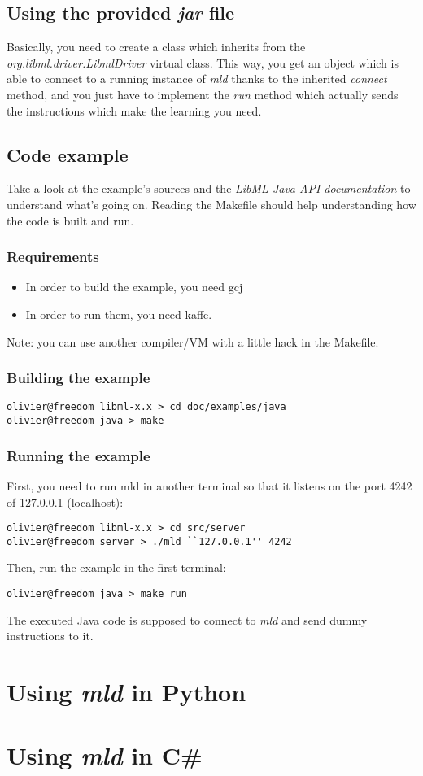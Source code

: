 \subsection{Using the provided \textit{jar} file}
Basically, you need to create a class which inherits from the
\textit{org.libml.driver.LibmlDriver} virtual class. This way, you get an
object which is able to connect to a running instance of \textit{mld} thanks
to the inherited \textit{connect} method, and you just have to implement the
\textit{run} method which actually sends the instructions which make the
learning you need.

\subsection{Code example}
Take a look at the example's sources and the
\textit{LibML Java API documentation} to understand what's going on. Reading
the Makefile should help understanding how the code is built and run.

\subsubsection{Requirements}
\begin{itemize}
\item In order to build the example, you need gcj
\item In order to run them, you need kaffe.
\end{itemize}
Note: you can use another compiler/VM with a little hack in the Makefile.

\subsubsection{Building the example}
\begin{verbatim}
olivier@freedom libml-x.x > cd doc/examples/java
olivier@freedom java > make
\end{verbatim}

\subsubsection{Running the example}
First, you need to run mld in another terminal so that it listens on the
port 4242 of 127.0.0.1 (localhost):
\begin{verbatim}
olivier@freedom libml-x.x > cd src/server
olivier@freedom server > ./mld ``127.0.0.1'' 4242
\end{verbatim}
Then, run the example in the first terminal:
\begin{verbatim}
olivier@freedom java > make run
\end{verbatim}
The executed Java code is supposed to connect to \textit{mld} and send dummy
instructions to it.

\newpage
\section{Using \textit{mld} in Python}

\newpage
\section{Using \textit{mld} in C\#}

